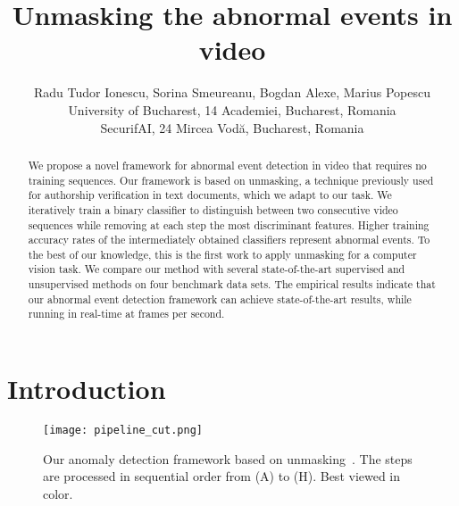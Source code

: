 \documentclass[10pt,twocolumn,letterpaper]{article}
\begin{document}
\title{Unmasking the abnormal events in video\vspace*{-0.1cm}}

\author{Radu Tudor Ionescu, Sorina Smeureanu, Bogdan Alexe, Marius Popescu\\
University of Bucharest, 14 Academiei, Bucharest, Romania\\
SecurifAI, 24 Mircea Vod\u{a}, Bucharest, Romania\vspace*{-0.2cm}
}

\maketitle



\begin{abstract}
We propose a novel framework for abnormal event detection in video that requires no training sequences. Our framework is based on unmasking, a technique previously used for authorship verification in text documents, which we adapt to our task. We iteratively train a binary classifier to distinguish between two consecutive video sequences while removing at each step the most discriminant features. Higher training accuracy rates of the intermediately obtained classifiers represent abnormal events. To the best of our knowledge, this is the first work to apply unmasking for a computer vision task.  We compare our method with several state-of-the-art supervised and unsupervised methods on four benchmark data sets. The empirical results indicate that our abnormal event detection framework can achieve state-of-the-art results, while running in real-time at  frames per second.
\end{abstract}

\vspace*{-0.4cm}
\section{Introduction}
\begin{figure}[t]

\begin{center}
\texttt{[image: pipeline\_cut.png]}
\end{center}
\vspace*{-0.4cm}
\caption{Our anomaly detection framework based on unmasking~\cite{Koppel-JMLR-2007}. The steps are processed in sequential order from (A) to (H). Best viewed in color.}
\label{fig_pipeline}
\vspace*{-0.4cm}
\end{figure}
\end{document}
